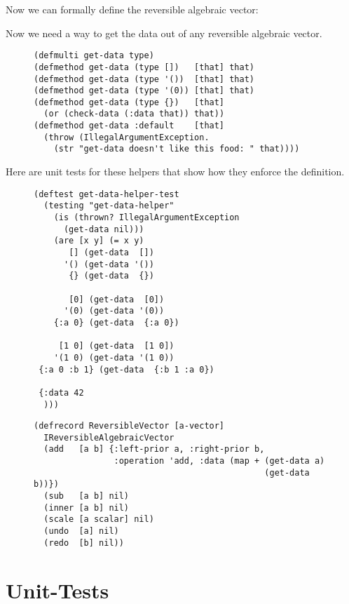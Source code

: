 \documentclass[11pt]{article}
\begin{document}
Now we can formally define the reversible algebraic vector:

Now we need a way to get the data out of any reversible algebraic
vector.

\begin{figure}[H]
\label{get-data-helper}
\begin{verbatim}
(defmulti get-data type)
(defmethod get-data (type [])   [that] that)
(defmethod get-data (type '())  [that] that)
(defmethod get-data (type '(0)) [that] that)
(defmethod get-data (type {})   [that]
  (or (check-data (:data that)) that))
(defmethod get-data :default    [that]
  (throw (IllegalArgumentException.
    (str "get-data doesn't like this food: " that))))
\end{verbatim}
\end{figure}

Here are unit tests for these helpers that show how they enforce the
definition.

\begin{figure}[H]
\label{test-get-data-helper}
\begin{verbatim}
(deftest get-data-helper-test
  (testing "get-data-helper"
    (is (thrown? IllegalArgumentException
      (get-data nil)))
    (are [x y] (= x y)
       [] (get-data  [])
      '() (get-data '())
       {} (get-data  {})

       [0] (get-data  [0])
      '(0) (get-data '(0))
    {:a 0} (get-data  {:a 0})

     [1 0] (get-data  [1 0])
    '(1 0) (get-data '(1 0))
 {:a 0 :b 1} (get-data  {:b 1 :a 0})

 {:data 42
  )))
\end{verbatim}
\end{figure}

\begin{figure}[H]
\label{reversible-algebraic-vector-on-vector}
\begin{verbatim}
(defrecord ReversibleVector [a-vector]
  IReversibleAlgebraicVector
  (add   [a b] {:left-prior a, :right-prior b,
                :operation 'add, :data (map + (get-data a)
                                              (get-data b))})
  (sub   [a b] nil)
  (inner [a b] nil)
  (scale [a scalar] nil)
  (undo  [a] nil)
  (redo  [b] nil))
\end{verbatim}
\end{figure}
\section{Unit-Tests}
\label{sec-3}
\end{document}
